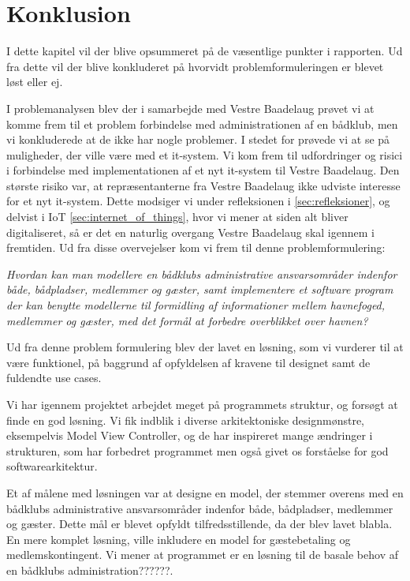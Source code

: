 \chapter{Konklusion}
\label{cha:konklusion}
I dette kapitel vil der blive opsummeret på de væsentlige punkter i rapporten. Ud fra dette vil der blive konkluderet på hvorvidt problemformuleringen er blevet løst eller ej.


I problemanalysen blev der i samarbejde med Vestre Baadelaug prøvet vi at komme frem til et problem forbindelse med administrationen af en bådklub, men vi konkluderede at de ikke har nogle problemer. I stedet for prøvede vi at se på muligheder, der ville være med et it-system. Vi kom frem til udfordringer og risici i forbindelse med implementationen af et nyt it-system til Vestre Baadelaug. Den største risiko var, at repræsentanterne fra Vestre Baadelaug ikke udviste interesse for et nyt it-system. Dette modsiger vi under refleksionen i \cref{sec:refleksioner}, og delvist i IoT \cref{sec:internet_of_things}, hvor vi mener at siden alt bliver digitaliseret, så er det en naturlig overgang Vestre Baadelaug skal igennem i fremtiden. Ud fra disse overvejelser kom vi frem til denne problemformulering:

\begin{displayquote}
\textit{Hvordan kan man modellere en bådklubs administrative ansvarsområder indenfor både, bådpladser, medlemmer og gæster, samt implementere et software program der kan benytte modellerne til formidling af informationer mellem havnefoged, medlemmer og gæster, med det formål at forbedre overblikket over havnen?}
\end{displayquote}

Ud fra denne problem formulering blev der lavet en løsning, som vi vurderer til at være funktionel, på baggrund af opfyldelsen af kravene til designet samt de fuldendte use cases.

Vi har igennem projektet arbejdet meget på programmets struktur, og forsøgt at finde en god løsning. Vi fik indblik i diverse arkitektoniske designmønstre, eksempelvis Model View Controller, og de har inspireret mange ændringer i strukturen, som har forbedret programmet men også givet os forståelse for god softwarearkitektur.


Et af målene med løsningen var at designe en model, der stemmer overens med en bådklubs administrative ansvarsområder indenfor både, bådpladser, medlemmer og gæster. Dette mål er blevet opfyldt tilfredsstillende, da der blev lavet blabla. En mere komplet løsning, ville inkludere en model for gæstebetaling og medlemskontingent. Vi mener at programmet er en løsning til de basale behov af en bådklubs administration??????.

